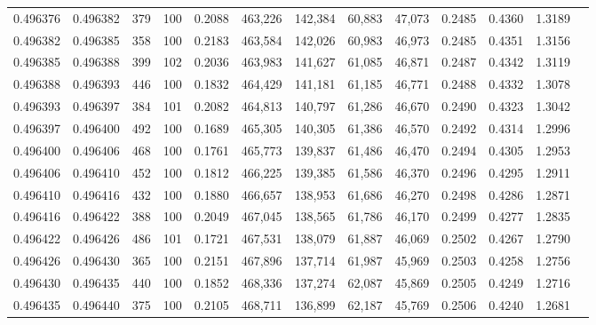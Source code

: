 \begin{tabular}{rrrrrrrrrrrrr}
0.496376 & 0.496382 &   379 & 100 &                                     0.2088 & 463,226 & 142,384 &  60,883 &  47,073 & 0.2485 & 0.4360 & 1.3189 \\
0.496382 & 0.496385 &   358 & 100 &                                     0.2183 & 463,584 & 142,026 &  60,983 &  46,973 & 0.2485 & 0.4351 & 1.3156 \\
0.496385 & 0.496388 &   399 & 102 &                                     0.2036 & 463,983 & 141,627 &  61,085 &  46,871 & 0.2487 & 0.4342 & 1.3119 \\
0.496388 & 0.496393 &   446 & 100 &                                     0.1832 & 464,429 & 141,181 &  61,185 &  46,771 & 0.2488 & 0.4332 & 1.3078 \\
0.496393 & 0.496397 &   384 & 101 &                                     0.2082 & 464,813 & 140,797 &  61,286 &  46,670 & 0.2490 & 0.4323 & 1.3042 \\
0.496397 & 0.496400 &   492 & 100 &                                     0.1689 & 465,305 & 140,305 &  61,386 &  46,570 & 0.2492 & 0.4314 & 1.2996 \\
0.496400 & 0.496406 &   468 & 100 &                                     0.1761 & 465,773 & 139,837 &  61,486 &  46,470 & 0.2494 & 0.4305 & 1.2953 \\
0.496406 & 0.496410 &   452 & 100 &                                     0.1812 & 466,225 & 139,385 &  61,586 &  46,370 & 0.2496 & 0.4295 & 1.2911 \\
0.496410 & 0.496416 &   432 & 100 &                                     0.1880 & 466,657 & 138,953 &  61,686 &  46,270 & 0.2498 & 0.4286 & 1.2871 \\
0.496416 & 0.496422 &   388 & 100 &                                     0.2049 & 467,045 & 138,565 &  61,786 &  46,170 & 0.2499 & 0.4277 & 1.2835 \\
0.496422 & 0.496426 &   486 & 101 &                                     0.1721 & 467,531 & 138,079 &  61,887 &  46,069 & 0.2502 & 0.4267 & 1.2790 \\
0.496426 & 0.496430 &   365 & 100 &                                     0.2151 & 467,896 & 137,714 &  61,987 &  45,969 & 0.2503 & 0.4258 & 1.2756 \\
0.496430 & 0.496435 &   440 & 100 &                                     0.1852 & 468,336 & 137,274 &  62,087 &  45,869 & 0.2505 & 0.4249 & 1.2716 \\
0.496435 & 0.496440 &   375 & 100 &                                     0.2105 & 468,711 & 136,899 &  62,187 &  45,769 & 0.2506 & 0.4240 & 1.2681 \\

\end{tabular}
